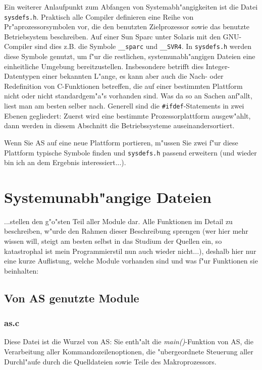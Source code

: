 \documentclass[12pt,a4paper,twoside]{report}
\newcommand{\asname}{AS}
\begin{document}
Ein weiterer Anlaufpunkt zum Abfangen von Systemabh"angigkeiten ist die
Datei {\tt sysdefs.h}.  Praktisch alle Compiler definieren eine Reihe von
Pr"aprozessorsymbolen vor, die den benutzten Zielprozessor sowie das
benutzte Betriebsystem beschreiben.  Auf einer Sun Sparc unter Solaris
mit den GNU-Compiler sind dies z.B. die Symbole \verb!__sparc! und
\verb!__SVR4!.  In {\tt sysdefs.h} werden diese Symbole genutzt, um f"ur
die restlichen, systemunabh"angigen Dateien eine einheitliche Umgebung
bereitzustellen.  Insbesondere betrifft dies Integer-Datentypen einer
bekannten L"ange, es kann aber auch die Nach- oder Redefinition von
C-Funktionen betreffen, die auf einer bestimmten Plattform nicht oder
nicht standardgem"a"s vorhanden sind.  Was da so an Sachen anf"allt, liest
man am besten selber nach.  Generell sind die \verb!#ifdef!-Statements in
zwei Ebenen gegliedert: Zuerst wird eine bestimmte Prozessorplattform
ausgew"ahlt, dann werden in diesem Abschnitt die Betriebssysteme
auseinandersortiert.

Wenn Sie \asname{} auf eine neue Plattform portieren, m"ussen Sie zwei f"ur diese
Plattform typische Symbole finden und {\tt sysdefs.h} passend erweitern
(und wieder bin ich an dem Ergebnis interessiert...).


\section{Systemunabh"angige Dateien}

...stellen den g"o"sten Teil aller Module dar.  Alle Funktionen im Detail
zu beschreiben, w"urde den Rahmen dieser Beschreibung sprengen (wer hier
mehr wissen will, steigt am besten selbst in das Studium der Quellen ein,
so katastrophal ist mein Programmierstil nun auch wieder nicht...),
deshalb hier nur eine kurze Auflistung, welche Module vorhanden sind und
was f"ur Funktionen sie beinhalten:

\subsection{Von \asname{} genutzte Module}

\subsubsection{as.c}

Diese Datei ist die Wurzel von \asname{}: Sie enth"alt die {\em main()}-Funktion
von \asname{}, die Verarbeitung aller Kommandozeilenoptionen, die "ubergeordnete
Steuerung aller Durchl"aufe durch die Quelldateien sowie Teile des
Makroprozessors.
\end{document}
